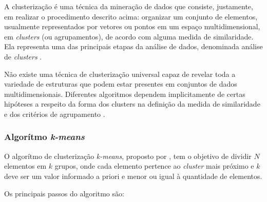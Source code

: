 A clusterização é uma técnica da mineração de dados que consiste, justamente, em realizar o procedimento descrito acima: organizar um conjunto de elementos, usualmente representados por vetores ou pontos em um espaço multidimensional, em \textit{clusters} (ou agrupamentos), de acordo com alguma medida de similaridade. Ela representa uma das principais etapas da análise de dados, denominada análise de \textit{clusters} \cite{jain1999}.

Não existe uma técnica de clusterização universal capaz de revelar toda a variedade de estruturas que podem estar presentes em conjuntos de dados multidimensionais. Diferentes algoritmos dependem implicitamente de certas hipóteses a respeito da forma dos clusters na definição da medida de similaridade e dos critérios de agrupamento \cite{estivill2002}.

\subsubsection{Algorítmo \textit{k-means}}
\label{sub:k_means}

O algorítmo de clusterização \textit{k-means}, proposto por , tem o objetivo de dividir \(N\) elementos em \(k\) grupos, onde cada elemento pertence ao \textit{cluster} mais próximo e \(k\) deve ser um valor informado a priori e menor ou igual à quantidade de elementos.

Os principais passos do algoritmo são:

